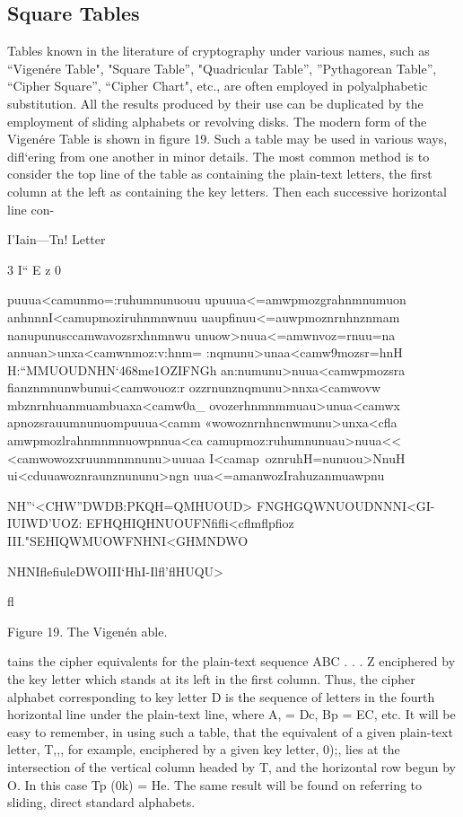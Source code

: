 \subsection{Square Tables}

\mypara Tables known in the literature of cryptography under various
names, such as “Vigenére Table", "Square Table”, "Quadricular Table”,
”Pythagorean Table”, “Cipher Square”, “Cipher Chart", etc., are often
employed in polyalphabetic substitution. All the results produced by their
use can be duplicated by the employment of sliding alphabets or revolving disks. The modern form of the Vigenére Table is shown in ﬁgure 19.
Such a table may be used in various ways, diﬂ‘ering from one another in
minor details. The most common method is to consider the top line of
the table as containing the plain-text letters, the ﬁrst column at the left
as containing the key letters. Then each successive horizontal line con-

I’Iain—Tn! Letter

3
I“
E
z
0

 

puuua<camunmo=:ruhumnunuouu
upuuua<=amwpmozgrahnmnumuon
anhnnnI<camupmoziruhnmnwnuu
uaupﬁnuu<=auwpmoznrnhnznmam
nanupunusccamwavozsrxhnmnwu
unuow>nuua<=amwnvoz=rnuu=na
annuan>unxa<camwnmoz:v:hnm=
:nqmunu>unaa<camw9mozsr=hnH
H:“MMUOUDNHN‘468me1OZIFNGh
an:numunu>nuua<camwpmozsra
ﬁanznmnunwbunui<camwouoz:r
ozzrnunznqmunu>nnxa<camwovw
mbznrnhuanmuambuaxa<camw0a_
ovozerhnmnmmuau>unua<camwx
apnozsrauumnunuompuuua<camm
«wowoznrnhncnwmunu>unxa<cﬂa
amwpmozlrahnmnmnuowpnnua<ca
camupmoz:ruhumnunuau>nuua<<
<camwowozxruunmnmnunu>uuuaa
I<camap~oznruhH=nunuou>NnuH
ui<cduuawoznraunznununu>ngn
uua<=amanwozIrahuzanmuawpnu

 

NH”‘<CHW”DWDB:PKQH=QMHUOUD>
FNGHGQWNUOUDNNNI<GI-IUIWD'UOZ:
EFHQHIQHNUOUFNﬁﬂi<cﬂmﬂpﬁoz
III."SEHIQWMUOWFNHNI<GHMNDWO

 

NHNIﬂeﬁuleDWOIII‘HhI-Ilﬂ'ﬂHUQU>

ﬂ

Figure 19. The Vigenén able.

 

tains the cipher equivalents for the plain-text sequence ABC . . . Z enciphered by the key letter which stands at its left in the ﬁrst column.
Thus, the cipher alphabet corresponding to key letter D is the sequence
of letters in the fourth horizontal line under the plain-text line, where
A, = Dc, Bp = EC, etc. It will be easy to remember, in using such a
table, that the equivalent of a given plain-text letter, T,,, for example,
enciphered by a given key letter, 0);, lies at the intersection of the vertical
column headed by T, and the horizontal row begun by O. In this case
Tp (0k) = He. The same result will be found on referring to sliding,
direct standard alphabets.

